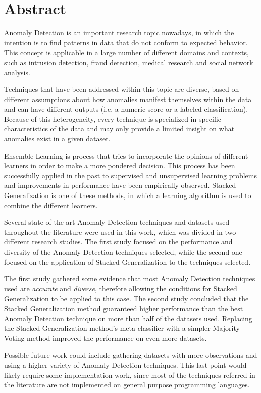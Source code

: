\chapter*{Abstract}

Anomaly Detection is an important research topic nowadays, in which the intention is to find patterns in data that do not conform to expected behavior. 
This concept is applicable in a large number of different domains and contexts, such as intrusion detection, fraud detection, medical research and social network analysis.

Techniques that have been addressed within this topic are diverse, based on different assumptions about how anomalies manifest themselves within the data and can have different outputs (i.e. a numeric score or a labeled classification).
Because of this heterogeneity, every technique is specialized in specific characteristics of the data and may only provide a limited insight on what anomalies exist in a given dataset.

Ensemble Learning is process that tries to incorporate the opinions of different learners in order to make a more pondered decision.
This process has been successfully applied in the past to supervised and unsupervised learning problems and improvements in performance have been empirically observed.
Stacked Generalization is one of these methods, in which a learning algorithm is used to combine the different learners.

Several state of the art Anomaly Detection techniques and datasets used throughout the literature were used in this work, which was divided in two different research studies.
The first study focused on the performance and diversity of the Anomaly Detection techniques selected, while the second one focused on the application of Stacked Generalization to the techniques selected.

The first study gathered some evidence that most Anomaly Detection techniques used are \textit{accurate} and \textit{diverse}, therefore allowing the conditions for Stacked Generalization to be applied to this case.
The second study concluded that the Stacked Generalization method guaranteed higher performance than the best Anomaly Detection technique on more than half of the datasets used.
Replacing the Stacked Generalization method's meta-classifier with a simpler Majority Voting method improved the performance on even more datasets.

Possible future work could include gathering datasets with more observations and using a higher variety of Anomaly Detection techniques. This last point would likely require some implementation work, since most of the techniques referred in the literature are not implemented on general purpose programming languages.

